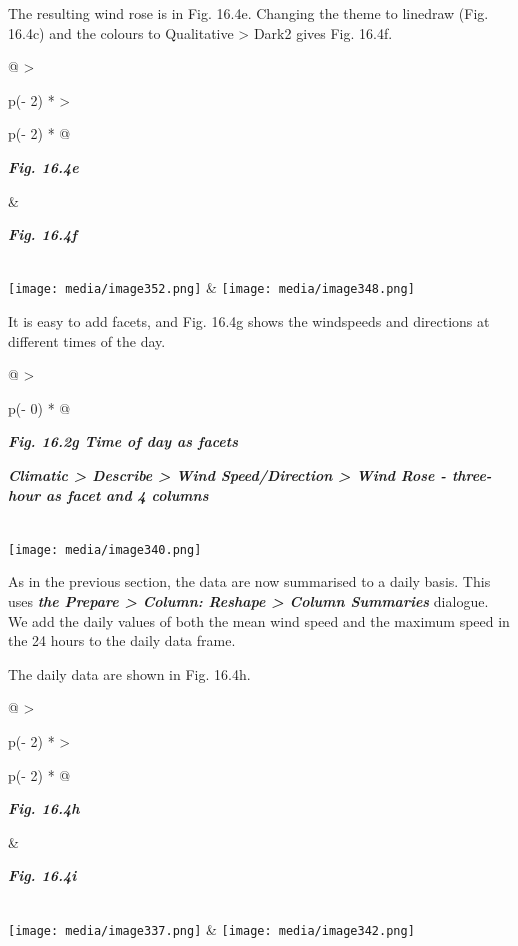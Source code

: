 \documentclass[
  letterpaper,
  DIV=11,
  numbers=noendperiod]{scrreprt}
\begin{document}
The resulting wind rose is in Fig. 16.4e. Changing the theme to linedraw
(Fig. 16.4c) and the colours to Qualitative \textgreater{} Dark2 gives
Fig. 16.4f.

\begin{longtable}[]{@{}
  >{\raggedright\arraybackslash}p{(\columnwidth - 2\tabcolsep) * }
  >{\raggedright\arraybackslash}p{(\columnwidth - 2\tabcolsep) * }@{}}
\toprule\noalign{}
\begin{minipage}[b]{\linewidth}\raggedright
\textbf{\emph{Fig. 16.4e}}
\end{minipage} & \begin{minipage}[b]{\linewidth}\raggedright
\textbf{\emph{Fig. 16.4f}}
\end{minipage} \\
\midrule\noalign{}
\endhead
\bottomrule\noalign{}
\endlastfoot
\texttt{[image: media/image352.png]} &
\texttt{[image: media/image348.png]} \\
\end{longtable}

It is easy to add facets, and Fig. 16.4g shows the windspeeds and
directions at different times of the day.

\begin{longtable}[]{@{}
  >{\raggedright\arraybackslash}p{(\columnwidth - 0\tabcolsep) * }@{}}
\toprule\noalign{}
\begin{minipage}[b]{\linewidth}\raggedright
\textbf{\emph{Fig. 16.2g Time of day as facets}}

\textbf{\emph{Climatic \textgreater{} Describe \textgreater{} Wind
Speed/Direction \textgreater{} Wind Rose - three-hour as facet and 4
columns}}
\end{minipage} \\
\midrule\noalign{}
\endhead
\bottomrule\noalign{}
\endlastfoot
\texttt{[image: media/image340.png]} \\
\end{longtable}

As in the previous section, the data are now summarised to a daily
basis. This uses \textbf{\emph{the Prepare \textgreater{} Column:
Reshape \textgreater{} Column Summaries}} dialogue. We add the daily
values of both the mean wind speed and the maximum speed in the 24 hours
to the daily data frame.

The daily data are shown in Fig. 16.4h.

\begin{longtable}[]{@{}
  >{\raggedright\arraybackslash}p{(\columnwidth - 2\tabcolsep) * }
  >{\raggedright\arraybackslash}p{(\columnwidth - 2\tabcolsep) * }@{}}
\toprule\noalign{}
\begin{minipage}[b]{\linewidth}\raggedright
\textbf{\emph{Fig. 16.4h}}
\end{minipage} & \begin{minipage}[b]{\linewidth}\raggedright
\textbf{\emph{Fig. 16.4i}}
\end{minipage} \\
\midrule\noalign{}
\endhead
\bottomrule\noalign{}
\endlastfoot
\texttt{[image: media/image337.png]} &
\texttt{[image: media/image342.png]} \\
\end{longtable}
\end{document}
